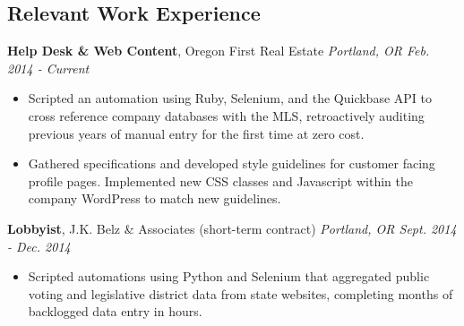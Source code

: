 \documentclass[11pt,line,centered]{res}
\begin{document}
\address{\tiny ddykes2@gmail.com | 971-238-4828 | github.com/rsq2}

\begin{resume}
\bigskip

\section{\sectionfont\normalsize Relevant Work Experience}
    \vspace{1em}
    \footnotesize{\bfseries Help Desk \& Web Content}, Oregon First Real Estate \hfill \textit{Portland, OR Feb. 2014 - Current}\\
        \vspace{-8mm}
        \begin{itemize}
            \setlength\itemsep{-1em}
            \item Scripted an automation using Ruby, Selenium, and the Quickbase API to cross reference company databases with the MLS,
                  retroactively auditing previous years of manual entry for the first time at zero cost.\\
            \item Gathered specifications and developed style guidelines for customer facing profile pages. Implemented new CSS classes
                  and Javascript within the company WordPress to match new guidelines.\\
        \end{itemize}
        \vspace{-5mm}

    \footnotesize{\bfseries Lobbyist}, J.K. Belz \& Associates (short-term contract) \hfill \textit{Portland, OR Sept. 2014 - Dec. 2014}\\
        \vspace{-8mm}
        \begin{itemize}
            \setlength\itemsep{-1em}
            \item Scripted automations using Python and Selenium that aggregated public voting and legislative district data from state
                  websites, completing months of backlogged data entry in hours. \\
        \end{itemize}


\end{resume}
\end{document}

